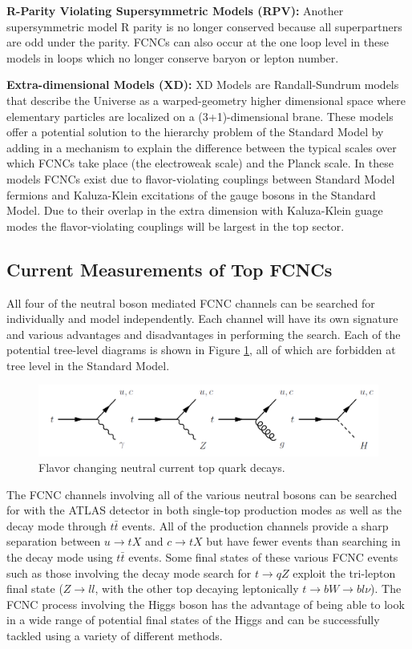 \textbf{R-Parity Violating Supersymmetric Models (RPV): }  Another supersymmetric model R parity is no longer conserved because all superpartners are odd under the parity.  FCNCs can also occur at the one loop level in these models in loops which no longer conserve baryon or lepton number.\cite{RPVSusyFCNC}

\textbf{Extra-dimensional Models (XD): }  XD Models are Randall-Sundrum models that describe the Universe as a warped-geometry higher dimensional space where elementary particles are localized on a (3+1)-dimensional brane.  These models offer a potential solution to the hierarchy problem of the Standard Model by adding in a mechanism to explain the difference between the typical scales over which FCNCs take place (the electroweak scale) and the Planck scale.  In these models FCNCs exist due to flavor-violating couplings between Standard Model fermions and Kaluza-Klein excitations of the gauge bosons in the Standard Model\cite{XDFCNC}.  Due to their overlap in the extra dimension with Kaluza-Klein guage modes the flavor-violating couplings will be largest in the top sector.


\subsection{Current Measurements of Top FCNCs}

All four of the neutral boson mediated FCNC channels can be searched for individually and model independently.  Each channel will have its own signature and various advantages and disadvantages in performing the search.  Each of the potential tree-level diagrams is shown in Figure \ref{fig:AllFCNCs}, all of which are forbidden at tree level in the Standard Model.  %
\begin{figure}[h!]
	\centering
	\includegraphics[width=\columnwidth]{../ThesisImages/Theory/AllFCNCDiagrams.png}
	\caption{Flavor changing neutral current top quark decays.}
	\label{fig:AllFCNCs}
\end{figure}

The FCNC channels involving all of the various neutral bosons can be searched for with the ATLAS detector in both single-top production modes as well as the decay mode through $t\bar{t}$ events.  All of the production channels provide a sharp separation between $u\rightarrow tX$ and $c\rightarrow tX$ but have fewer events than searching in the decay mode using $t\bar{t}$ events.  Some final states of these various FCNC events such as those involving the decay mode search for $t\rightarrow q Z$ exploit the tri-lepton final state ($Z\rightarrow ll$, with the other top decaying leptonically $t\rightarrow bW\rightarrow bl\nu$).  The FCNC process involving the Higgs boson has the advantage of being able to look in a wide range of potential final states of the Higgs and can be successfully tackled using a variety of different methods.

